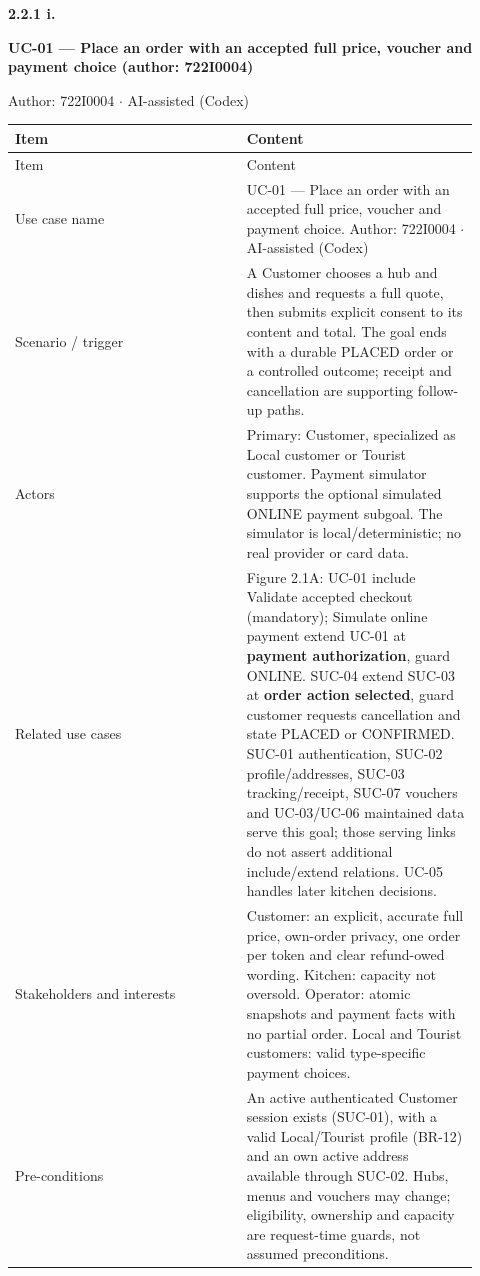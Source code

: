 \textbf{2.2.1 i.}\par
\textbf{UC-01 --- Place an order with an accepted full price, voucher and payment choice (author: 722I0004)}

Author: 722I0004 \ensuremath{\cdot} AI-assisted (Codex)

\begin{longtable}{>{\raggedright\arraybackslash}p{0.4600\linewidth}>{\raggedright\arraybackslash}p{0.4600\linewidth}}
Item & Content \\
\hline\endfirsthead
Item & Content \\
\hline\endhead
Use case name & UC-01 --- Place an order with an accepted full price, voucher and payment choice. Author: 722I0004 \ensuremath{\cdot} AI-assisted (Codex) \\
Scenario / trigger & A Customer chooses a hub and dishes and requests a full quote, then submits explicit consent to its content and total. The goal ends with a durable PLACED order or a controlled outcome; receipt and cancellation are supporting follow-up paths. \\
Actors & Primary: Customer, specialized as Local customer or Tourist customer. Payment simulator supports the optional simulated ONLINE payment subgoal. The simulator is local/deterministic; no real provider or card data. \\
Related use cases & Figure 2.1A: UC-01 \guillemotleft{}include\guillemotright{} Validate accepted checkout (mandatory); Simulate online payment \guillemotleft{}extend\guillemotright{} UC-01 at \textbf{payment authorization}, guard ONLINE. SUC-04 \guillemotleft{}extend\guillemotright{} SUC-03 at \textbf{order action selected}, guard customer requests cancellation and state PLACED or CONFIRMED. SUC-01 authentication, SUC-02 profile/addresses, SUC-03 tracking/receipt, SUC-07 vouchers and UC-03/UC-06 maintained data serve this goal; those serving links do not assert additional include/extend relations. UC-05 handles later kitchen decisions. \\
Stakeholders and interests & Customer: an explicit, accurate full price, own-order privacy, one order per token and clear refund-owed wording. Kitchen: capacity not oversold. Operator: atomic snapshots and payment facts with no partial order. Local and Tourist customers: valid type-specific payment choices. \\
Pre-conditions & An active authenticated Customer session exists (SUC-01), with a valid Local/Tourist profile (BR-12) and an own active address available through SUC-02. Hubs, menus and vouchers may change; eligibility, ownership and capacity are request-time guards, not assumed preconditions. \\

\end{longtable}
